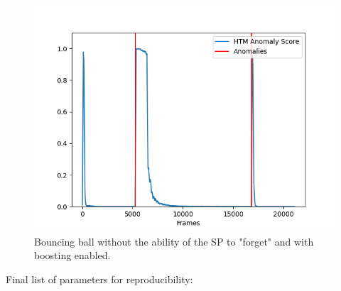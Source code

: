 \begin{figure}[H]
    \centering
    \includegraphics[width=\textwidth]{resources/experiments/bouncing_ball/bb_anoms_unforgetting_boosting.png}
    \caption{Bouncing ball without the ability of the SP to "forget" and with boosting enabled.}
\end{figure}
Final list of parameters for reproducibility:
